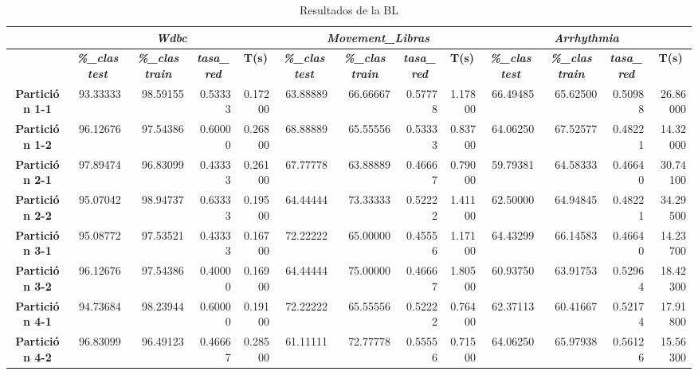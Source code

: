 \documentclass[a4paper,11pt]{article}
\begin{document}
   \begin{table}[H]	
    \caption*{Resultados de la BL}
    \begin{adjustbox}{width=1.1\textwidth} 
    \begin{tabular}{|c|r|r|r|r|r|r|r|r|r|r|r|r|}
    \hline
    \multicolumn{1}{|l|}{} & \multicolumn{ 4}{c|}{\textbf{\textit{Wdbc}}} & \multicolumn{ 4}{c|}{\textbf{\textit{Movement\_Libras}}} & \multicolumn{ 4}{c|}{\textbf{\textit{Arrhythmia}}} \\ \hline
    & \multicolumn{1}{c|}{\textbf{\textit{\%\_clas test}}} & \multicolumn{1}{c|}{\textbf{\textit{\%\_clas train}}} & \multicolumn{1}{c|}{\textbf{\textit{tasa\_red}}} & \multicolumn{1}{c|}{\textbf{T(s)}} & \multicolumn{1}{c|}{\textbf{\textit{\%\_clas test}}} & \multicolumn{1}{c|}{\textbf{\textit{\%\_clas train}}} & \multicolumn{1}{c|}{\textbf{\textit{tasa\_red}}} & \multicolumn{1}{c|}{\textbf{T(s)}} & \multicolumn{1}{c|}{\textbf{\textit{\%\_clas test}}} & \multicolumn{1}{c|}{\textbf{\textit{\%\_clas train}}} & \multicolumn{1}{c|}{\textbf{\textit{tasa\_red}}} & \multicolumn{1}{c|}{\textbf{T(s)}} \\ \hline
    \textbf{Partición 1-1} & 93.33333 & 98.59155 & 0.53333 & 0.17200 & 63.88889 & 66.66667 & 0.57778 & 1.17800 & 66.49485 & 65.62500 & 0.50988 & 26.86000 \\ \hline
    \textbf{Partición 1-2} & 96.12676 & 97.54386 & 0.60000 & 0.26800 & 68.88889 & 65.55556 & 0.53333 & 0.83700 & 64.06250 & 67.52577 & 0.48221 & 14.32000 \\ \hline
    \textbf{Partición 2-1} & 97.89474 & 96.83099 & 0.43333 & 0.26100 & 67.77778 & 63.88889 & 0.46667 & 0.79000 & 59.79381 & 64.58333 & 0.46640 & 30.74100 \\ \hline
    \textbf{Partición 2-2} & 95.07042 & 98.94737 & 0.63333 & 0.19500 & 64.44444 & 73.33333 & 0.52222 & 1.41100 & 62.50000 & 64.94845 & 0.48221 & 34.29500 \\ \hline
    \textbf{Partición 3-1} & 95.08772 & 97.53521 & 0.43333 & 0.16700 & 72.22222 & 65.00000 & 0.45556 & 1.17100 & 64.43299 & 66.14583 & 0.46640 & 14.23700 \\ \hline
    \textbf{Partición 3-2} & 96.12676 & 97.54386 & 0.40000 & 0.16900 & 64.44444 & 75.00000 & 0.46667 & 1.80500 & 60.93750 & 63.91753 & 0.52964 & 18.42300 \\ \hline
    \textbf{Partición 4-1} & 94.73684 & 98.23944 & 0.60000 & 0.19100 & 72.22222 & 65.55556 & 0.52222 & 0.76400 & 62.37113 & 60.41667 & 0.52174 & 17.91800 \\ \hline
    \textbf{Partición 4-2} & 96.83099 & 96.49123 & 0.46667 & 0.28500 & 61.11111 & 72.77778 & 0.55556 & 0.71500 & 64.06250 & 65.97938 & 0.56126 & 15.56300 \\ \hline

\end{tabular}
\end{adjustbox}
\end{table}
\end{document}
